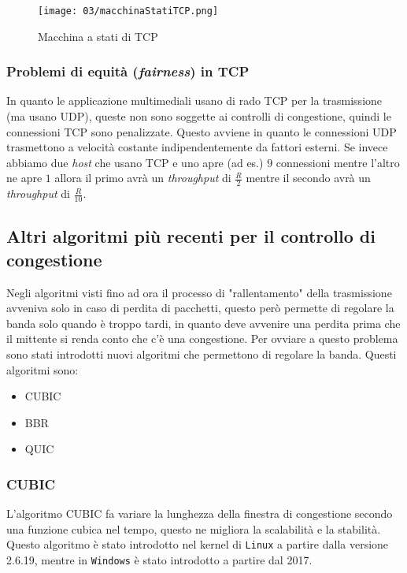             \begin{figure}[H]
                \centering
                \texttt{[image: 03/macchinaStatiTCP.png]}
                \caption{Macchina a stati di \Acrshort*{TCP}}
            \end{figure}
        \subsubsection{Problemi di equità (\textit{fairness}) in \Acrshort*{TCP}}
            In quanto le applicazione multimediali usano di rado \Acrshort*{TCP} per la trasmissione (ma usano \Acrshort*{UDP}), queste non sono soggette ai controlli di congestione, quindi le connessioni \Acrshort*{TCP} sono penalizzate. Questo avviene in quanto le connessioni \Acrshort*{UDP} trasmettono a velocità costante indipendentemente da fattori esterni.\newline
            Se invece abbiamo due \textit{host} che usano \Acrshort*{TCP} e uno apre (ad es.) $ 9 $ connessioni mentre l'altro ne apre $ 1 $ allora il primo avrà un \textit{throughput} di $ \frac{R}2 $ mentre il secondo avrà un \textit{throughput} di $ \frac{R} {10} $.
    \subsection{Altri algoritmi più recenti per il controllo di congestione}
        Negli algoritmi visti fino ad ora il processo di "rallentamento" della trasmissione avveniva solo in caso di perdita di pacchetti, questo però permette di regolare la banda solo quando è troppo tardi, in quanto deve avvenire una perdita prima che il mittente si renda conto che c'è una congestione. Per ovviare a questo problema sono stati introdotti nuovi algoritmi che permettono di regolare la banda. Questi algoritmi sono: \begin{itemize}
            \item \Acrfull*{CUBIC}
            \item \Acrfull*{BBR}
            \item \Acrfull*{QUIC}
        \end{itemize}
        \subsubsection{\Acrfull*{CUBIC}}
            L'algoritmo \Acrshort*{CUBIC} fa variare la lunghezza della finestra di congestione secondo una funzione cubica nel tempo, questo ne migliora la scalabilità e la stabilità. Questo algoritmo è stato introdotto nel kernel di \texttt{Linux} a partire dalla versione 2.6.19, mentre in \texttt{Windows} è stato introdotto a partire dal 2017.
